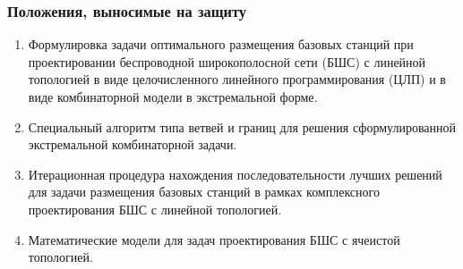 \begin{frame}
    \setcounter{framenumber}{1}
    \maketitle
\end{frame}

\begin{frame}
    \frametitle{Положения, выносимые на защиту}
    
\begin{enumerate}
    \item Формулировка задачи оптимального размещения базовых станций при проектировании беспроводной широкополосной сети (БШС) с линейной топологией в виде целочисленного линейного программирования (ЦЛП) и в виде комбинаторной модели в экстремальной форме.
   
    \item Специальный алгоритм типа ветвей и границ для решения сформулированной экстремальной комбинаторной задачи.
    \item Итерационная процедура нахождения последовательности лучших решений для задачи размещения базовых станций в рамках комплексного проектирования БШС с линейной топологией.
    \item Математические модели для задач проектирования БШС с ячеистой топологией.

\end{enumerate}
\end{frame}





